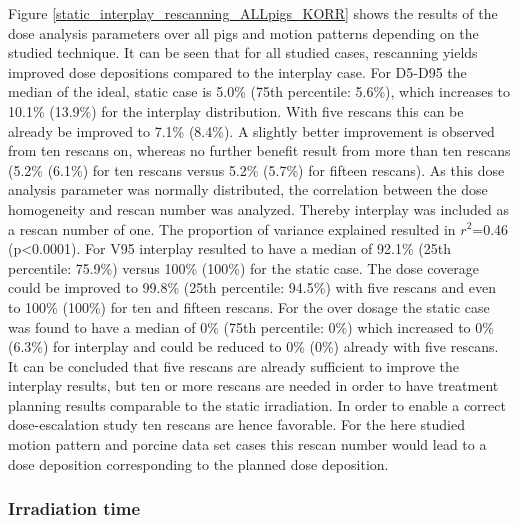\documentclass[type=dr, dr=rernat, accentcolor=tud7b,colorbacktitle, bigchapter, openright, twoside, 12pt ]{tudthesis}
\begin{document}
Figure \ref{static_interplay_rescanning_ALLpigs_KORR} shows the results of the dose analysis parameters over all pigs and motion patterns 
depending on the studied technique. It can be seen that for all studied cases, rescanning yields improved dose depositions compared to the 
interplay case. For D5-D95 the median of the ideal, static case is 5.0\% (75th percentile: 5.6\%), which 
increases to 10.1\% (13.9\%) for the interplay distribution. With five rescans this can be already be improved to 7.1\% (8.4\%). A slightly 
better improvement is observed from ten rescans on, whereas no further benefit result from more than ten rescans (5.2\% (6.1\%) for ten rescans 
versus 5.2\% (5.7\%) for fifteen rescans). As this dose analysis parameter was normally distributed, the correlation between the dose homogeneity 
and rescan number was analyzed. Thereby interplay was included as a rescan number of one. 
The proportion of variance explained resulted in $r^{2}$=0.46 (p<0.0001). 
For V95 interplay resulted to have a median of 92.1\% (25th percentile: 75.9\%) versus 100\% (100\%) for the static case. The dose coverage 
could be improved to 99.8\% (25th percentile: 94.5\%) with five rescans and even to 100\% (100\%) for ten and fifteen rescans. 
For the over dosage the static case was found to have a median of 0\% (75th percentile: 0\%) which increased to 0\% (6.3\%) for interplay and 
could be reduced to 0\% (0\%) already with five rescans.\newline
\newline
It can be concluded that five rescans are already sufficient to improve the interplay results, but ten or more rescans are needed in order 
to have treatment planning results comparable to the static irradiation. 
In order to enable a correct dose-escalation study ten rescans are hence favorable. For the here studied motion pattern and porcine data 
set cases this rescan number would lead to a dose deposition corresponding to the planned dose deposition. 

\newpage

\subsubsection{Irradiation time}
\end{document}
